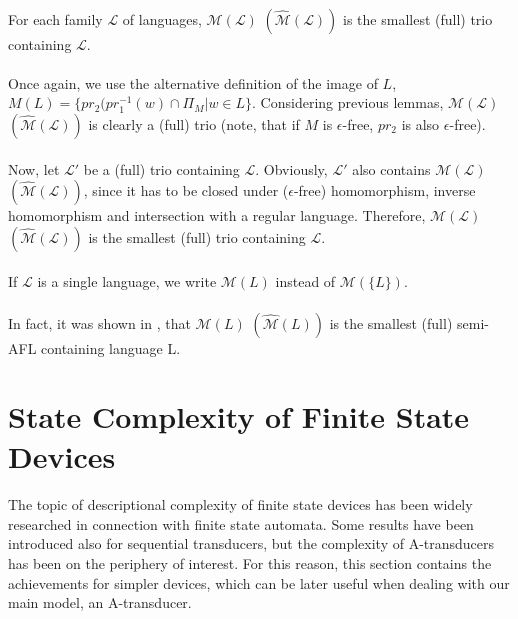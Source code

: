 \paragraph{}
\cveta For each family $\mathcal{L} $ of languages, $\mathcal{M(L)} $ $(\mathcal{\hat{M}(L)}) $ is the smallest (full) trio containing $\mathcal{L} $.

\paragraph{}
\dokaz Once again, we use the alternative definition of the image of $L$, $M(L) = \{ pr_{2}(pr_{1}^{-1}(w) \cap \Pi_{M} | w \in L \}$. Considering previous lemmas, $\mathcal{M(L)} $ $(\mathcal{\hat{M}(L)}) $ is clearly a (full) trio (note, that if $M$ is $\epsilon $-free, $pr_{2}$ is also $\epsilon $-free).

\paragraph{}
Now, let $\mathcal{L'} $ be a (full) trio containing $\mathcal{L} $. Obviously, $\mathcal{L'} $ also contains $\mathcal{M(L)} $ $(\mathcal{\hat{M}(L)}) $, since it has to be closed under ($\epsilon $-free) homomorphism, inverse homomorphism and intersection with a regular language. Therefore, $\mathcal{M(L)} $ $(\mathcal{\hat{M}(L)}) $ is the smallest (full) trio containing $\mathcal{L} $. \square

\paragraph{}
\oznacenie If $\mathcal{L}$ is a single language, we write $\mathcal{M}(L)$ instead of $\mathcal{M}(\{ L\} )$.

\paragraph{}
In fact, it was shown in \cite{gingrei:pAFL}, that $\mathcal{M}(L) $ $(\mathcal{\hat{M}}(L)) $ is the smallest (full) semi-AFL containing language L.

\section{State Complexity of Finite State Devices}
\paragraph{}
The topic of descriptional complexity of finite state devices has been widely researched in connection with finite state automata. Some results have been introduced also for sequential transducers, but the complexity of A-transducers has been on the periphery of interest. For this reason, this section contains the achievements for simpler devices, which can be later useful when dealing with our main model, an A-transducer.

